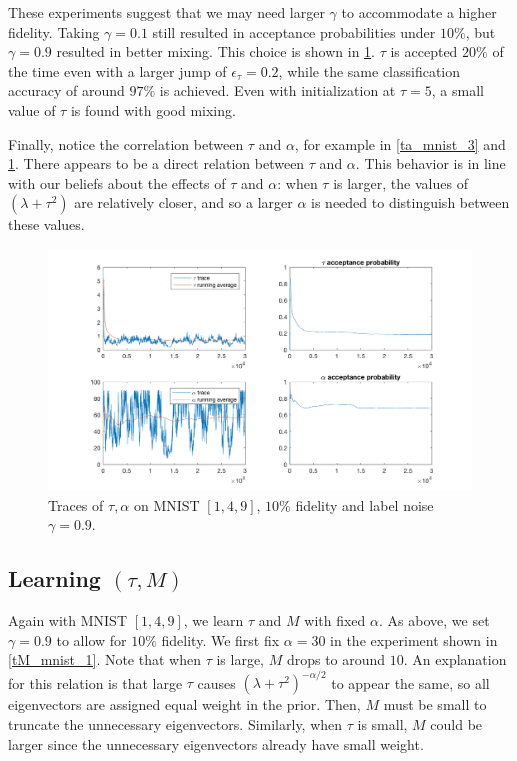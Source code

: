 \documentclass{siamart1116}
\begin{document}
        These experiments suggest that we may need larger $\gamma$ to accommodate a higher fidelity. Taking $\gamma = 0.1$ still resulted in acceptance probabilities under $10\%$, but $\gamma = 0.9$ resulted in better mixing. This choice is shown in \cref{ta_mnist_4}. $\tau$ is accepted $20\%$ of the time even with a larger jump of $\epsilon_\tau = 0.2$, while the same classification accuracy of around $97\%$ is achieved. Even with initialization at $\tau=5$, a small value of $\tau$ is found with good mixing. 

        Finally, notice the correlation between $\tau$ and $\alpha$, for example in \cref{ta_mnist_3} and \cref{ta_mnist_4}. There appears to be a direct relation between $\tau$ and $\alpha$. This behavior is in line with our beliefs about the effects of $\tau$ and $\alpha$: when $\tau$ is larger, the values of $(\lambda + \tau^2)$ are relatively closer, and so a larger $\alpha$ is needed to distinguish between these values.

        \begin{figure}[!htb]
        \centering
        \caption{\label{ta_mnist_4}Traces of $\tau, \alpha$ on MNIST $[1, 4, 9]$, $10\%$ fidelity and label noise $\gamma = 0.9$.}
        \includegraphics[width=0.8\linewidth]{choose_hyp/t_a/good_tau.png}
        \end{figure}

    \subsection{Learning $(\tau, M)$}
        Again with MNIST $[1, 4, 9]$, we learn $\tau$ and $M$ with fixed $\alpha$. As above, we set $\gamma = 0.9$ to allow for $10\%$ fidelity. We first fix $\alpha=30$ in the experiment shown in \cref{tM_mnist_1}. Note that when $\tau$ is large, $M$ drops to around $10$. An explanation for this relation is that large $\tau$ causes $(\lambda + \tau^2)^{-\alpha/2}$ to appear the same, so all eigenvectors are assigned equal weight in the prior. Then, $M$ must be small to truncate the unnecessary eigenvectors. Similarly, when $\tau$ is small, $M$ could be larger since the unnecessary eigenvectors already have small weight.
\end{document}
